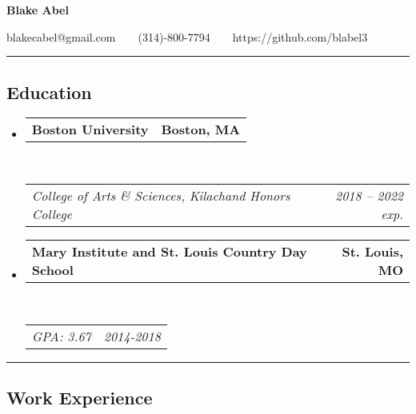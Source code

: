 \documentclass[11pt,letterpaper]{article}
\makeatletter
\newcommand{\headerrow}[2]
{\begin{tabular*}{\linewidth}{l@{\extracolsep{\fill}}r}
	#1 &
	#2 \\
\end{tabular*}}
\makeatother
\begin{document}
\begin{center}
{\LARGE \textbf{Blake Abel}}

blakecabel@gmail.com\ \ \textbullet \ \ (314)-800-7794\ \ \textbullet \ \ https://github.com/blabel3

\end{center}

\hrule
\vspace{-0.4em}
\subsection*{Education}

\begin{itemize}
	\parskip=0.1em

	\item 
	\headerrow
		{\textbf{Boston University}}
		{\textbf{Boston, MA}}
	\\
	\headerrow
		{\emph{College of Arts \& Sciences, Kilachand Honors College}}
		{\emph{2018 -- 2022 exp.}}
	
	\item 
	\headerrow
		{\textbf{Mary Institute and St. Louis Country Day School }}
		{\textbf{St. Louis, MO}}
	\\
	\headerrow
		{\emph{GPA: 3.67}}
		{\emph{2014-2018}}

\end{itemize}

\hrule
\vspace{-0.4em}
\subsection*{Work Experience}
\end{document}
